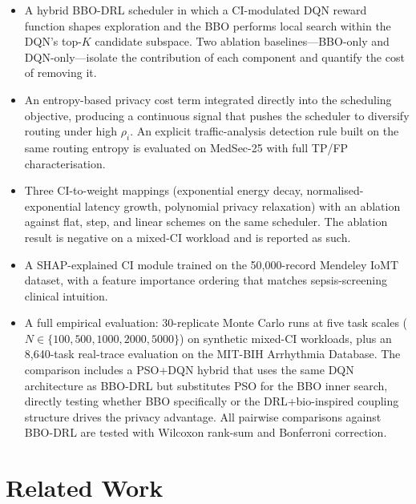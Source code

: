 \documentclass[journal]{IEEEtran}
\begin{document}
\begin{itemize}
  \item A hybrid BBO-DRL scheduler in which a CI-modulated DQN reward
        function shapes exploration and the BBO performs local search
        within the DQN's top-$K$ candidate subspace. Two ablation
        baselines---BBO-only and DQN-only---isolate the contribution
        of each component and quantify the cost of removing it.
  \item An entropy-based privacy cost term integrated directly into the
        scheduling objective, producing a continuous signal that pushes
        the scheduler to diversify routing under high $\rho_i$. An
        explicit traffic-analysis detection rule built on the same
        routing entropy is evaluated on MedSec-25 with full TP/FP
        characterisation.
  \item Three CI-to-weight mappings (exponential energy decay,
        normalised-exponential latency growth, polynomial privacy
        relaxation) with an ablation against flat, step, and linear
        schemes on the same scheduler. The ablation result is negative
        on a mixed-CI workload and is reported as such.
  \item A SHAP-explained CI module trained on the 50{,}000-record
        Mendeley IoMT dataset, with a feature importance ordering that
        matches sepsis-screening clinical intuition.
  \item A full empirical evaluation: 30-replicate Monte Carlo runs at
        five task scales ($N \in \{100, 500, 1000, 2000, 5000\}$) on
        synthetic mixed-CI workloads, plus an 8{,}640-task real-trace
        evaluation on the MIT-BIH Arrhythmia Database. The comparison
        includes a PSO+DQN hybrid that uses the same DQN architecture
        as BBO-DRL but substitutes PSO for the BBO inner search,
        directly testing whether BBO specifically or the DRL+bio-inspired
        coupling structure drives the privacy advantage. All pairwise
        comparisons against BBO-DRL are tested with Wilcoxon rank-sum
        and Bonferroni correction.
\end{itemize}

\section{Related Work}
\label{sec:related}
\end{document}
